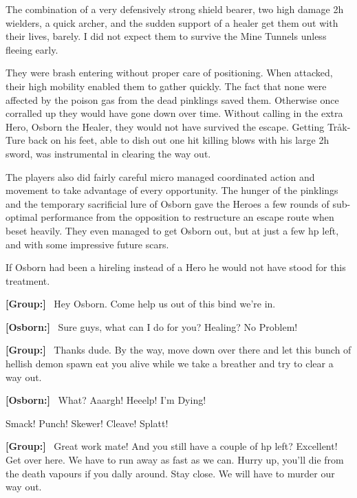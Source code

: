\begin{readoutloud}
The combination of a very defensively strong shield bearer, two high damage 2h wielders, a quick archer, and the sudden support of a healer get them out with their lives, barely. I did not expect them to survive the Mine Tunnels unless fleeing early.

They were brash entering without proper care of positioning. When attacked, their high mobility enabled them to gather quickly. The fact that none were affected by the poison gas from the dead pinklings saved them. Otherwise once corralled up they would have gone down over time. Without calling in the extra Hero, Osborn the Healer, they would not have survived the escape. Getting Tråk-Ture back on his feet, able to dish out one hit killing blows with his large 2h sword, was instrumental in clearing the way out.

The players also did fairly careful micro managed coordinated action and movement to take advantage of every opportunity. The hunger of the pinklings and the temporary sacrificial lure of Osborn gave the Heroes a few rounds of sub-optimal performance from the opposition to restructure an escape route when beset heavily. They even managed to get Osborn out, but at just a few hp left, and with some impressive future scars.

If Osborn had been a hireling instead of a Hero he would not have stood for this treatment.

\vsmall\textbf{[Group:]}\normalsize ~ Hey Osborn. Come help us out of this bind we're in.

\vsmall\textbf{[Osborn:]}\normalsize ~ Sure guys, what can I do for you? Healing? No Problem!

\vsmall\textbf{[Group:]}\normalsize ~ Thanks dude. By the way, move down over there and let this bunch of hellish demon spawn eat you alive while we take a breather and try to clear a way out.

\vsmall\textbf{[Osborn:]}\normalsize ~ What? Aaargh! Heeelp! I'm Dying!

Smack! Punch! Skewer! Cleave! Splatt!

\vsmall\textbf{[Group:]}\normalsize ~ Great work mate! And you still have a couple of hp left? Excellent! Get over here. We have to run away as fast as we can. Hurry up, you'll die from the death vapours if you dally around. Stay close. We will have to murder our way out.
\end{readoutloud}

\


